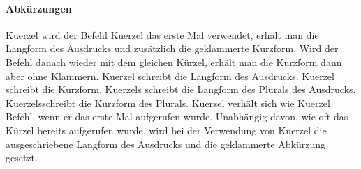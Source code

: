 \paragraph*{Abkürzungen}

	\ac{Kuerzel} wird der Befehl \ac{Kuerzel} das erste Mal verwendet, erhält man die Langform des Ausdrucks und zusätzlich die geklammerte Kurzform. Wird der Befehl danach wieder mit dem gleichen Kürzel, erhält man die Kurzform dann aber ohne Klammern.
	\acl{Kuerzel} schreibt die Langform des Ausdrucks.
	\acs{Kuerzel} schreibt die Kurzform.
	\aclp{Kuerzel} schreibt die Langform des Plurals des Ausdrucks.
	\acsp{Kuerzel}schreibt die Kurzform des Plurals.
	\acf{Kuerzel} verhält sich wie \ac{Kuerzel} Befehl, wenn er das erste Mal aufgerufen wurde. Unabhängig davon, wie oft das Kürzel bereits aufgerufen wurde, wird bei der Verwendung von \acf{Kuerzel} die ausgeschriebene Langform des Ausdrucks und die geklammerte Abkürzung gesetzt.